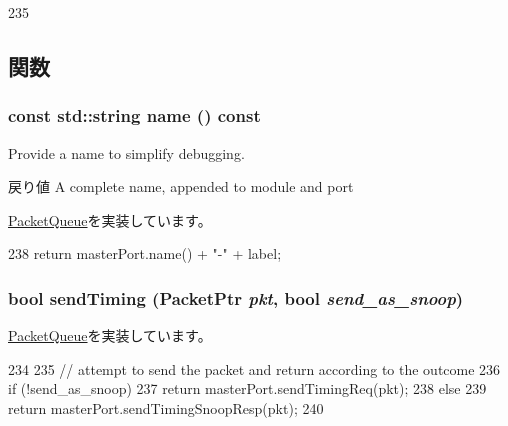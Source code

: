 \begin{DoxyCode}
235 { }
\end{DoxyCode}


\subsection{関数}
\hypertarget{classMasterPacketQueue_a6490f765a824ced1cc94979609fe7e07}{
\subsubsection[{name}]{\setlength{\rightskip}{0pt plus 5cm}const std::string name () const}}
\label{classMasterPacketQueue_a6490f765a824ced1cc94979609fe7e07}
Provide a name to simplify debugging.

\begin{DoxyReturn}{戻り値}
A complete name, appended to module and port 
\end{DoxyReturn}


\hyperlink{classPacketQueue_a2d319721a65496069642871a52e47056}{PacketQueue}を実装しています。


\begin{DoxyCode}
238     { return masterPort.name() + "-" + label; }
\end{DoxyCode}
\hypertarget{classMasterPacketQueue_a49e787c20f2f8d3e4fc0b8213bebcfc4}{
\subsubsection[{sendTiming}]{\setlength{\rightskip}{0pt plus 5cm}bool sendTiming ({\bf PacketPtr} {\em pkt}, \/  bool {\em send\_\-as\_\-snoop})}}
\label{classMasterPacketQueue_a49e787c20f2f8d3e4fc0b8213bebcfc4}


\hyperlink{classPacketQueue_a3111a75f1ac04df57de8a34ded64a82d}{PacketQueue}を実装しています。


\begin{DoxyCode}
234 {
235     // attempt to send the packet and return according to the outcome
236     if (!send_as_snoop)
237         return masterPort.sendTimingReq(pkt);
238     else
239         return masterPort.sendTimingSnoopResp(pkt);
240 }
\end{DoxyCode}


